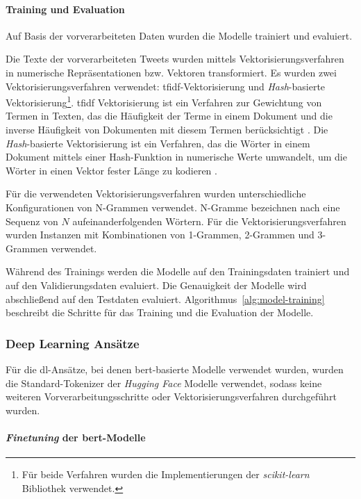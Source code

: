 \paragraph{Training und Evaluation}
Auf Basis der vorverarbeiteten Daten wurden die Modelle trainiert und evaluiert.

Die Texte der vorverarbeiteten Tweets wurden mittels Vektorisierungsverfahren in numerische Repräsentationen bzw. Vektoren transformiert.
Es wurden zwei Vekto\-risierungs\-verfahren verwendet: \gls{tfidf}-Vek\-to\-ri\-sie\-rung und \textit{Hash}-basierte Vektorisierung\footnote{Für beide Verfahren wurden die Implementierungen der \textit{scikit-learn} Bibliothek verwendet.}.
\gls{tfidf} Vektorisierung ist ein Verfahren zur Gewichtung von Termen in Texten, das die Häufigkeit der Terme in einem Dokument und die inverse Häufigkeit von Dokumenten mit diesem Termen berücksichtigt \cite[S. 119]{manning2009introduction}.
Die \textit{Hash}-basierte Vektorisierung ist ein Verfahren, das die Wörter in einem Dokument mittels einer Hash-Funktion in numerische Werte umwandelt, um die Wörter in einen Vektor fester Länge zu kodieren \cite{sklearnextraction2025}.

Für die verwendeten Vektorisierungsverfahren wurden unterschiedliche Konfigurationen von N-Grammen verwendet.
N-Gramme bezeichnen nach \cite[S.33]{jm3} eine Sequenz von $N$ aufeinanderfolgenden Wörtern.
Für die Vektorisierungsverfahren wurden Instanzen mit Kombinationen von 1-Grammen, 2-Grammen und 3-Grammen verwendet.

Während des Trainings werden die Modelle auf den Trainingsdaten trainiert und auf den Validierungsdaten evaluiert.
Die Genauigkeit der Modelle wird abschließend auf den Testdaten evaluiert.
Algorithmus~\ref{alg:model-training} beschreibt die Schritte für das Training und die Evaluation der Modelle.

\subsubsection{Deep Learning Ansätze} \label{subsubsec:experimente-deep-learning-ansaetze}

Für die \gls{dl}-Ansätze, bei denen \gls{bert}-basierte Modelle verwendet wurden, wurden die Standard-Tokenizer der \textit{Hugging Face} Modelle verwendet, sodass keine weiteren Vorverarbeitungsschritte oder Vektorisierungsverfahren durchgeführt wurden.

\paragraph{\textit{Finetuning} der \gls{bert}-Modelle}

